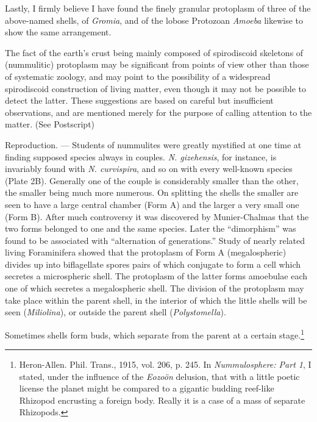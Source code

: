 \documentclass[a4paper, 12pt, oneside, landscape]{article}
\begin{document}
Lastly, I firmly believe I have found the finely granular protoplasm of three of the above-named shells, of \emph{Gromia}, and of the lobose Protozoan \emph{Amoeba} likewise to show the same arrangement.

The fact of the earth's crust being mainly composed of spirodiscoid skeletons of (nummulitic) protoplasm may be significant from points of view other than those of systematic zoology, and may point to the possibility of a widespread spirodiscoid construction of living matter, even though it may not be possible to detect the latter. These suggestions are based on careful but insufficient observations, and are mentioned merely for the purpose of calling attention to the matter. (See Postscript)

Reproduction. --- Students of nummulites were greatly mystified at one time at finding supposed species always in couples. \emph{N. gizehensis}, for instance, is invariably found with \emph{N. curvispira}, and so on with every well-known species (Plate 2B). Generally one of the couple is considerably smaller than the other, the smaller being much more numerous. On splitting the shells the smaller are seen to have a large central chamber (Form A) and the larger a very small one (Form B). After much controversy it was discovered by Munier-Chalmas that the two forms belonged to one and the same species. Later the ``dimorphism'' was found to be associated with ``alternation of generations.'' Study of nearly related living Foraminifera showed that the protoplasm of Form A (megalospheric) divides up into biflagellate spores pairs of which conjugate to form a cell which secretes a microspheric shell. The protoplasm of the latter forms amoebulae each one of which secretes a megalospheric shell. The division of the protoplasm may take place within the parent shell, in the interior of which the little shells will be seen (\emph{Miliolina}), or outside the parent shell (\emph{Polystomella}).

Sometimes shells form buds, which separate from the parent at a certain stage.\footnote{Heron-Allen. Phil. Trans., 1915, vol. 206, p. 245. In \emph{Nummulosphere: Part 1}, I stated, under the influence of the \emph{Eozoön} delusion, that with a little poetic license the planet might be compared to a gigantic budding reef-like Rhizopod encrusting a foreign body. Really it is a case of a mass of separate Rhizopods.}
\end{document}
